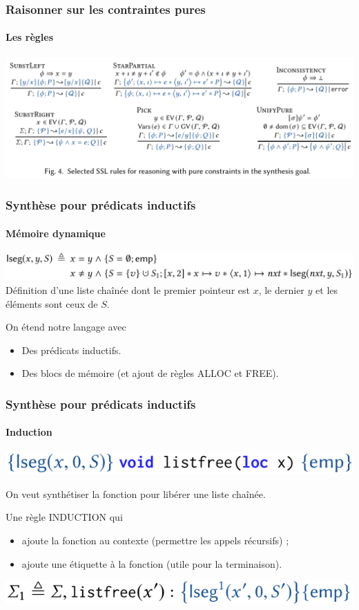 \documentclass[french]{beamer}
\begin{document}
\begin{frame}[fragile]
	\frametitle{Raisonner sur les contraintes pures}
	\framesubtitle{Les règles}
   \centering
   \includegraphics[width=\linewidth]{figures/pure_constraints.png}
\end{frame}


\begin{frame}[fragile]
	\frametitle{Synthèse pour prédicats inductifs}
	\framesubtitle{Mémoire dynamique}
   \begin{center}
      \includegraphics[width=\linewidth]{figures/lseg.png}
   Définition d'une liste chaînée dont le premier pointeur est $x$,
   le dernier $y$ et les éléments sont ceux de $S$.
   \end{center}
   On étend notre langage avec 
   \begin{itemize}   
      \item Des prédicats inductifs.
      \item Des blocs de mémoire (et ajout de règles \textsc{ALLOC} et \textsc{FREE}).
   \end{itemize}
\end{frame}

\begin{frame}[fragile]
	\frametitle{Synthèse pour prédicats inductifs}
	\framesubtitle{Induction}
   \begin{center}
      \includegraphics[height=\baselineskip]{figures/induction1.png}
   \end{center}
   On veut synthétiser la fonction pour libérer une liste chaînée.
   
   Une règle \textsc{INDUCTION} qui 
   \begin{itemize}
      \item ajoute la fonction au contexte (permettre les appels récursifs) ;
      \item ajoute une étiquette à la fonction (utile pour la terminaison).
   \end{itemize} 
   \begin{center}
      \includegraphics[height=\baselineskip]{figures/induction2.png}
   \end{center}
\end{frame}
\end{document}
